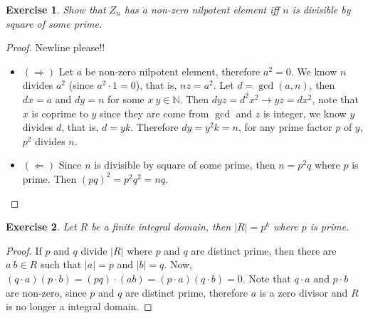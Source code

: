 \documentclass[14pt]{extarticle}
\newtheorem{exercise}{Exercise}[section]
\newcommand{\join}[3][,]{#2_0 #1 #2_1 #1 \cdots #1 #2_{#3}}
\newcommand{\1}{\{e\}}
\newcommand{\N}{\mathbb{N}}
\begin{document}
\setcounter{exercise}{19}
\begin{exercise}
  Show that $Z_n$ has a non-zero nilpotent element iff $n$ is divisible by
  square of some prime.
\end{exercise}
\begin{proof}
  Newline please!!
  \begin{itemize}
    \item $(\Rightarrow)$ Let $a$ be non-zero nilpotent element, therefore $a^2 = 0$.
      We know $n$ divides $a^2$ (since $a^2 \cdot 1 = 0$), that is, $nz = a^2$. Let $d = \gcd(a, n)$, then $dx = a$ and $dy = n$ 
      for some $x \ y \in \N$.
      Then $dyz = d^2x^2 \rightarrow yz = dx^2$, 
      note that $x$ is coprime to $y$ since they are come from $\gcd$ and $z$ is integer,
      we know $y$ divides $d$, that is, $d = yk$.
      Therefore $dy = y^2k = n$, for any prime factor $p$ of $y$, $p^2$ divides $n$.
    \item $(\Leftarrow)$ Since $n$ is divisible by square of some prime,
      then $n = p^2q$ where $p$ is prime. Then $(pq)^2 = p^2q^2 = nq$.
  \end{itemize}
\end{proof}

\setcounter{exercise}{33}
\begin{exercise}
  Let $R$ be a finite integral domain, then $|R| = p^k$ where $p$ is prime.
\end{exercise}
\begin{proof}
  If $p$ and $q$ divide $|R|$ where $p$ and $q$ are distinct prime,
  then there are $a \ b \in R$ such that $|a| = p$ and $|b| = q$.
  Now, $(q \cdot a)(p \cdot b) = (pq) \cdot (ab) = (p \cdot a) (q \cdot b) = 0$.
  Note that $q \cdot a$ and $p \cdot b$ are non-zero, since $p$ and $q$ are distinct prime,
  therefore $a$ is a zero divisor and $R$ is no longer a integral domain.
\end{proof}
\end{document}
